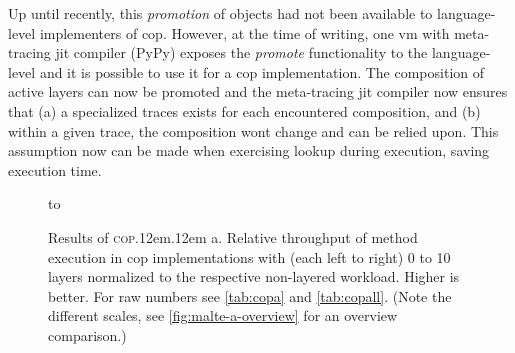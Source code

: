 \documentclass[preprint,english,10pt,nonatbib]{sigplanconf}
\DeclareRobustCommand*\copa{\textsc{cop}\kern .12em\oldstylenums{09}\kern .12em a\xspace}
\begin{document}
Up until recently, this \emph{promotion} of objects had not been available to
language-level implementers of \ac{cop}. However, at the time of writing, one
\ac{vm} with meta-tracing \ac{jit} compiler (PyPy) exposes the \emph{promote}
functionality to the language-level and it is possible to use it for a \ac{cop}
implementation. The composition of active layers can now be promoted and the
meta-tracing \ac{jit} compiler now ensures that (a) a specialized traces exists
for each encountered composition, and (b) within a given trace, the composition
wont change and can be relied upon. This assumption now can be made when
exercising lookup during execution, saving execution time.

\begin{figure}[t]
  \centering
  \hbox to 
\caption{Results of \copa. Relative throughput of method execution in
  \protect\acs{cop} implementations with (each left to right) 0 to 10 layers
  normalized to the respective non-layered workload. Higher is better. For raw
  numbers see \autoref{tab:copa} and \autoref{tab:copall}. (Note
  the different scales, see \autoref{fig:malte-a-overview} for an overview
  comparison.)}
  \label{fig:malte-a}
\end{figure}
\end{document}

